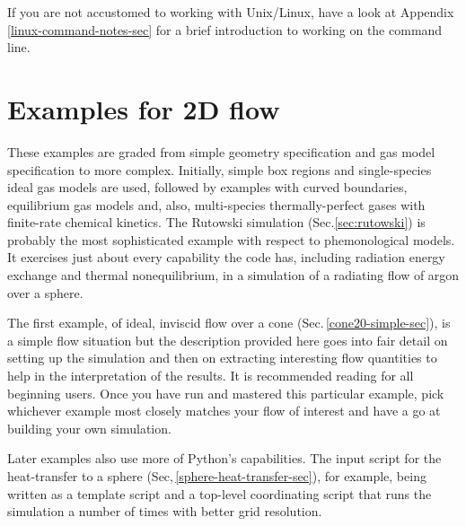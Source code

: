 \documentclass[12pt,a4paper,twoside]{article}
\begin{document}
\medskip
If you are not accustomed to working with Unix/Linux, 
have a look at Appendix\,\ref{linux-command-notes-sec}
for a brief introduction to working on the command line.




 
\cleardoublepage

\part{Examples for 2D flow}
%
These examples are graded from simple geometry specification and gas model specification
to more complex.
Initially, simple box regions and single-species ideal gas models are used, followed by
examples with curved boundaries, equilibrium gas models and, also, 
multi-species thermally-perfect gases with finite-rate chemical kinetics.
The Rutowski simulation (Sec.\ref{sec:rutowski}) is probably the most sophisticated example
with respect to phemonological models.
It exercises just about every capability the code has, 
including radiation energy exchange and thermal nonequilibrium,
in a simulation of a radiating flow of argon over a sphere.

\medskip
The first example, of ideal, inviscid flow over a cone (Sec.\,\ref{cone20-simple-sec}), 
is a simple flow situation but the description provided here goes into fair detail 
on setting up the simulation and then on extracting interesting flow quantities 
to help in the interpretation of the results. 
It is recommended reading for all beginning users.
Once you have run and mastered this particular example, 
pick whichever example most closely matches your flow of interest 
and have a go at building your own simulation.

\medskip
Later examples also use more of Python's capabilities.
The input script for the heat-transfer to a sphere (Sec,\,\ref{sphere-heat-transfer-sec}), 
for example, being written as a template script and a top-level 
coordinating script that runs the simulation a number of times with better grid resolution.
\end{document}
